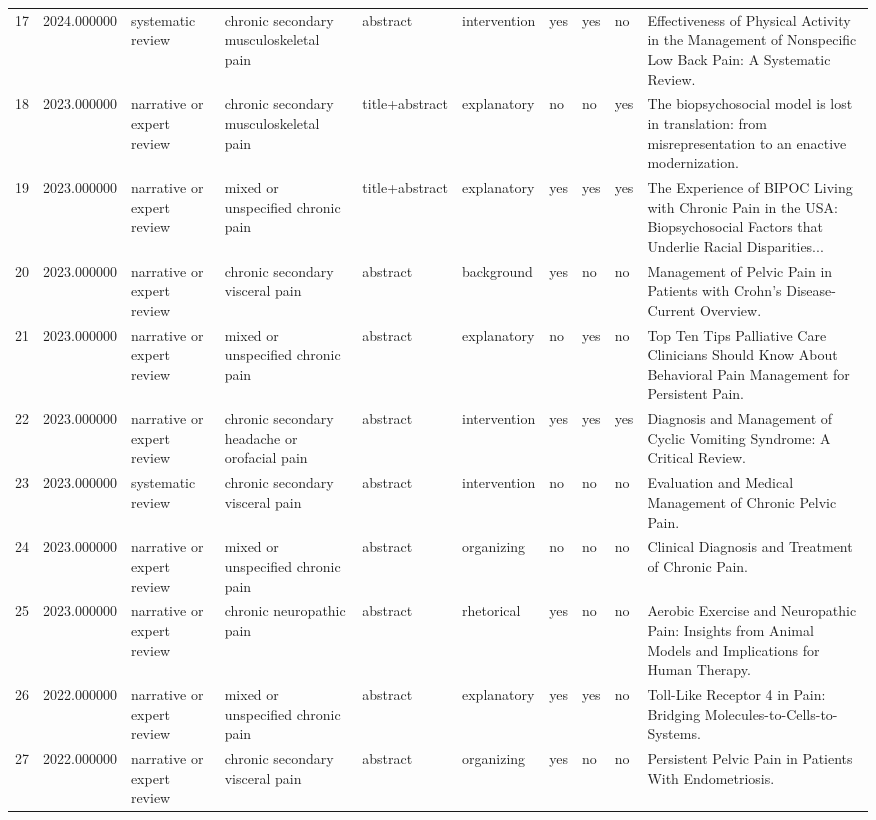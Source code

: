 \begin{longtable}{p{0.7cm}p{0.7cm}p{1.2cm}p{1.9cm}p{1.3cm}p{1.5cm}p{0.55cm}p{0.55cm}p{0.55cm}p{3.2cm}}
17 & 2024.000000 & systematic review & chronic secondary musculoskeletal pain & abstract & intervention & yes & yes & no & Effectiveness of Physical Activity in the Management of Nonspecific Low Back Pain: A Systematic Review. \\
18 & 2023.000000 & narrative or expert review & chronic secondary musculoskeletal pain & title+abstract & explanatory & no & no & yes & The biopsychosocial model is lost in translation: from misrepresentation to an enactive modernization. \\
19 & 2023.000000 & narrative or expert review & mixed or unspecified chronic pain & title+abstract & explanatory & yes & yes & yes & The Experience of BIPOC Living with Chronic Pain in the USA: Biopsychosocial Factors that Underlie Racial Disparities... \\
20 & 2023.000000 & narrative or expert review & chronic secondary visceral pain & abstract & background & yes & no & no & Management of Pelvic Pain in Patients with Crohn's Disease-Current Overview. \\
21 & 2023.000000 & narrative or expert review & mixed or unspecified chronic pain & abstract & explanatory & no & yes & no & Top Ten Tips Palliative Care Clinicians Should Know About Behavioral Pain Management for Persistent Pain. \\
22 & 2023.000000 & narrative or expert review & chronic secondary headache or orofacial pain & abstract & intervention & yes & yes & yes & Diagnosis and Management of Cyclic Vomiting Syndrome: A Critical Review. \\
23 & 2023.000000 & systematic review & chronic secondary visceral pain & abstract & intervention & no & no & no & Evaluation and Medical Management of Chronic Pelvic Pain. \\
24 & 2023.000000 & narrative or expert review & mixed or unspecified chronic pain & abstract & organizing & no & no & no & Clinical Diagnosis and Treatment of Chronic Pain. \\
25 & 2023.000000 & narrative or expert review & chronic neuropathic pain & abstract & rhetorical & yes & no & no & Aerobic Exercise and Neuropathic Pain: Insights from Animal Models and Implications for Human Therapy. \\
26 & 2022.000000 & narrative or expert review & mixed or unspecified chronic pain & abstract & explanatory & yes & yes & no & Toll-Like Receptor 4 in Pain: Bridging Molecules-to-Cells-to-Systems. \\
27 & 2022.000000 & narrative or expert review & chronic secondary visceral pain & abstract & organizing & yes & no & no & Persistent Pelvic Pain in Patients With Endometriosis. \\

\end{longtable}
